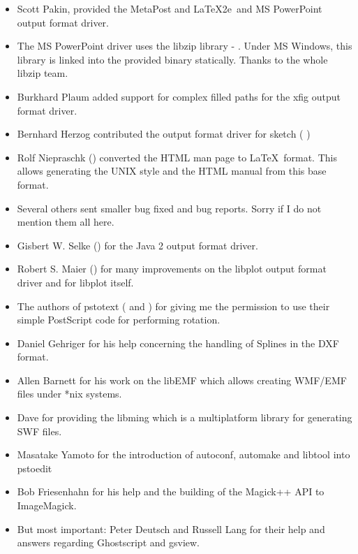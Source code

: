 \documentclass[english,a4paper]{article}
\begin{document}
\begin{itemize}
  \item Scott Pakin,  provided the MetaPost and \LaTeX2e\ and MS PowerPoint output format driver.

  \item The MS PowerPoint driver uses the libzip library - . Under MS Windows, this library is linked into the provided binary statically. Thanks to the whole libzip team.

  \item Burkhard Plaum  added support for
     complex filled paths for the xfig output format driver.

  \item Bernhard Herzog  contributed the output format driver for
     sketch (  )

  \item Rolf Niepraschk () converted the HTML man page
     to \LaTeX\  format. This allows generating the UNIX style and the HTML manual from this
     base format.

  \item Several others sent smaller bug fixed and bug reports. Sorry if I do not
     mention them all here.

  \item Gisbert W. Selke () for the Java 2 output format driver.

  \item Robert S. Maier () for many improvements on
	the libplot output format driver and for libplot itself.
  \item The authors of pstotext ( and )
	for giving me the permission to use their simple PostScript code for
	performing rotation.
  \item Daniel Gehriger  for his help concerning the handling of Splines in the DXF format.
  \item Allen Barnett  for his work on the libEMF which allows creating WMF/EMF files under *nix systems.
  \item Dave  for providing the libming which is a multiplatform library for generating SWF files.
  \item Masatake Yamoto for the introduction of autoconf, automake and libtool into pstoedit
  \item Bob Friesenhahn for his help and the building of the Magick++ API to ImageMagick.
  \item But most important: Peter Deutsch  and Russell
     Lang  for their help and answers regarding
     Ghostscript and gsview.


\end{itemize}
\end{document}
